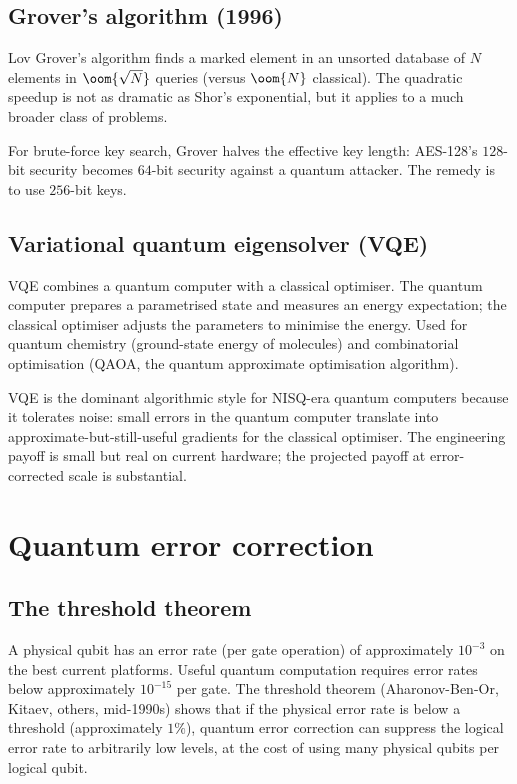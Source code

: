 \subsection{Grover's algorithm (1996)}

Lov Grover's algorithm finds a marked element in an unsorted database of $N$ elements in $\oom{\sqrt{N}}$ queries (versus $\oom{N}$ classical). The quadratic speedup is not as dramatic as Shor's exponential, but it applies to a much broader class of problems.

For brute-force key search, Grover halves the effective key length: AES-128's $128$-bit security becomes $64$-bit security against a quantum attacker. The remedy is to use $256$-bit keys.

\subsection{Variational quantum eigensolver (VQE)}

VQE combines a quantum computer with a classical optimiser. The quantum computer prepares a parametrised state and measures an energy expectation; the classical optimiser adjusts the parameters to minimise the energy. Used for quantum chemistry (ground-state energy of molecules) and combinatorial optimisation (QAOA, the quantum approximate optimisation algorithm).

VQE is the dominant algorithmic style for NISQ-era quantum computers because it tolerates noise: small errors in the quantum computer translate into approximate-but-still-useful gradients for the classical optimiser. The engineering payoff is small but real on current hardware; the projected payoff at error-corrected scale is substantial.

\section{Quantum error correction}

\subsection{The threshold theorem}

A physical qubit has an error rate (per gate operation) of approximately $10^{-3}$ on the best current platforms. Useful quantum computation requires error rates below approximately $10^{-15}$ per gate. The threshold theorem (Aharonov-Ben-Or, Kitaev, others, mid-1990s) shows that if the physical error rate is below a threshold (approximately $1\%$), quantum error correction can suppress the logical error rate to arbitrarily low levels, at the cost of using many physical qubits per logical qubit.

